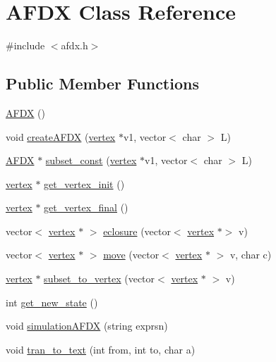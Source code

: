 \hypertarget{class_a_f_d_x}{}\section{A\+F\+DX Class Reference}
\label{class_a_f_d_x}


{\ttfamily \#include $<$afdx.\+h$>$}

\subsection*{Public Member Functions}
\begin{DoxyCompactItemize}
\item 
\hyperlink{class_a_f_d_x_a4abb1326f70153217b6f27dc08135e5d}{A\+F\+DX} ()
\item 
void \hyperlink{class_a_f_d_x_aaf36a335cbb6d03b46993dc01355f756}{create\+A\+F\+DX} (\hyperlink{structvertex}{vertex} $\ast$v1, vector$<$ char $>$ L)
\item 
\hyperlink{class_a_f_d_x}{A\+F\+DX} $\ast$ \hyperlink{class_a_f_d_x_a7f4f46c25fb5a5b3f1be898dde218aa2}{subset\+\_\+const} (\hyperlink{structvertex}{vertex} $\ast$v1, vector$<$ char $>$ L)
\item 
\hyperlink{structvertex}{vertex} $\ast$ \hyperlink{class_a_f_d_x_aa78cba34334092271a7cffc86a8cd344}{get\+\_\+vertex\+\_\+init} ()
\item 
\hyperlink{structvertex}{vertex} $\ast$ \hyperlink{class_a_f_d_x_ac7b12b227145c478fca9a00f785656ab}{get\+\_\+vertex\+\_\+final} ()
\item 
vector$<$ \hyperlink{structvertex}{vertex} $\ast$ $>$ \hyperlink{class_a_f_d_x_af0430e9d0436d6a02e75549d36f46b14}{eclosure} (vector$<$ \hyperlink{structvertex}{vertex} $\ast$$>$ v)
\item 
vector$<$ \hyperlink{structvertex}{vertex} $\ast$ $>$ \hyperlink{class_a_f_d_x_a312f7b6465d0a7b906449f01d23f199c}{move} (vector$<$ \hyperlink{structvertex}{vertex} $\ast$ $>$ v, char c)
\item 
\hyperlink{structvertex}{vertex} $\ast$ \hyperlink{class_a_f_d_x_a55926260ee08e47aced2343f9672f28f}{subset\+\_\+to\+\_\+vertex} (vector$<$ \hyperlink{structvertex}{vertex} $\ast$ $>$ v)
\item 
int \hyperlink{class_a_f_d_x_a5f578f0b5ac5b77d800aa765626f94e1}{get\+\_\+new\+\_\+state} ()
\item 
void \hyperlink{class_a_f_d_x_ae47ecdcac8ec88b22d88fa1bfa52f781}{simulation\+A\+F\+DX} (string exprsn)
\item 
void \hyperlink{class_a_f_d_x_a7fb827f82eaefdb25a042b50fa2986ce}{tran\+\_\+to\+\_\+text} (int from, int to, char a)
$$
\end{DoxyCompactItemize}
